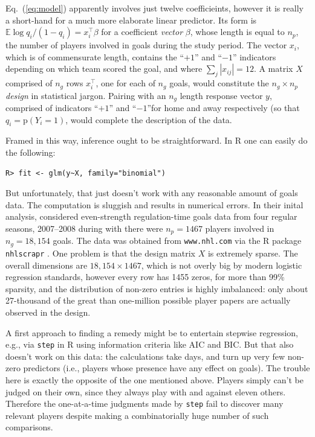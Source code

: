 Eq.~(\ref{eq:model}) apparently involves just twelve
coefficieints, however it is really a short-hand for a much more elaborate
linear predictor. Its form is $\mathbb{E} \log q_i/(1-q_i) = x_i^\top \beta$ for a
coefficient {\em vector} $\beta$, whose length is equal to $n_p$, the number
of players involved in goals during the study period.  The vector $x_i$, which
is of commensurate length, contains the ``$+1$'' and ``$-1$'' indicators
depending on which team scored the goal, and where $\sum_j |x_{ij}| = 12$.  A
matrix $X$ comprised of $n_g$ rows $x_i^\top$, one for each of $n_g$ goals,
would constitute the $n_g \times n_p$ {\em design} in statistical jargon.
Pairing with an $n_g$ length response vector $y$, comprised of indicators
``$+1$'' and ``$-1$''for home and away respectively (so that $q_i =
\mathrm{p}(Y_i = 1)$,
would complete the description of the data.

Framed in this way, inference ought to be straightforward.  In {\sf R}
one can easily do the following:
\begin{verbatim}
R> fit <- glm(y~X, family="binomial")
\end{verbatim}
But unfortunately, that just doesn't work with any reasonable amount of goals
data.  The computation is sluggish and results in numerical errors. In their
inital analysis, \cite{gramacy:jensen:taddy:2013} considered even-strength
regulation-time goals data from four regular seasons, 2007--2008 during
with there were $n_p = 1467$ players involved in $n_g = 18,\!154$ goals.  The
data was obtained from \verb!www.nhl.com! via the {\sf R} package {\tt
nhlscrapr} \cite{nhlscrapr}. One problem is that the design matrix $X$ is
extremely sparse. The overall dimensions are $18,\!154 \times 1467$, which is
not overly big by modern logistic regression standards, however every row
has 1455 zeros, for more than 99\% sparsity, and the distribution of non-zero
entries is highly imbalanced: only about 27-thousand of the great than
one-million possible player papers are actually observed in the design.  

A first approach to finding a remedy might be to entertain stepwise
regression, e.g., via {\tt step} in {\sf R} using information criteria like
AIC and BIC.  But that also doesn't work on this data: the calculations take
days, and turn up very few non-zero predictors (i.e., players whose presence
have any effect on goals).  The trouble here is exactly the opposite of the
one mentioned above.  Players simply can't be judged on their own, since they
always play with and against eleven others.  Therefore the one-at-a-time
judgments made by {\tt step} fail to discover many relevant players despite
making a combinatorially huge number of such comparisons.

